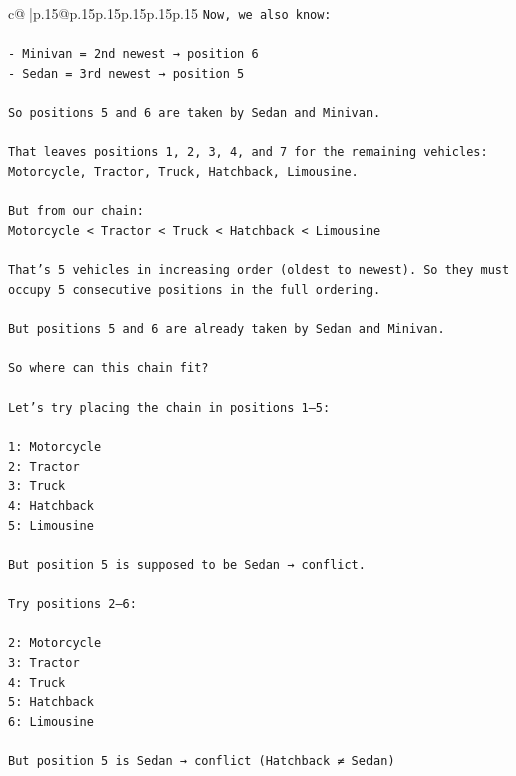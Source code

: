 \documentclass{article}
\begin{document}
{\begin{supertabular}{c@{$\;$}|p{.15\linewidth}@{}p{.15\linewidth}p{.15\linewidth}p{.15\linewidth}p{.15\linewidth}p{.15\linewidth}}
{{{\texttt{Now, we also know:} \\
\\ 
\texttt{{-} Minivan = 2nd newest → position 6} \\
\texttt{{-} Sedan = 3rd newest → position 5} \\
\\ 
\texttt{So positions 5 and 6 are taken by Sedan and Minivan.} \\
\\ 
\texttt{That leaves positions 1, 2, 3, 4, and 7 for the remaining vehicles: Motorcycle, Tractor, Truck, Hatchback, Limousine.} \\
\\ 
\texttt{But from our chain:  } \\
\texttt{Motorcycle < Tractor < Truck < Hatchback < Limousine} \\
\\ 
\texttt{That’s 5 vehicles in increasing order (oldest to newest). So they must occupy 5 consecutive positions in the full ordering.} \\
\\ 
\texttt{But positions 5 and 6 are already taken by Sedan and Minivan.} \\
\\ 
\texttt{So where can this chain fit?} \\
\\ 
\texttt{Let’s try placing the chain in positions 1–5:} \\
\\ 
\texttt{1: Motorcycle  } \\
\texttt{2: Tractor  } \\
\texttt{3: Truck  } \\
\texttt{4: Hatchback  } \\
\texttt{5: Limousine} \\
\\ 
\texttt{But position 5 is supposed to be Sedan → conflict.} \\
\\ 
\texttt{Try positions 2–6:} \\
\\ 
\texttt{2: Motorcycle  } \\
\texttt{3: Tractor  } \\
\texttt{4: Truck  } \\
\texttt{5: Hatchback  } \\
\texttt{6: Limousine} \\
\\ 
\texttt{But position 5 is Sedan → conflict (Hatchback ≠ Sedan)} \\
}}}
\end{supertabular}}
\end{document}
